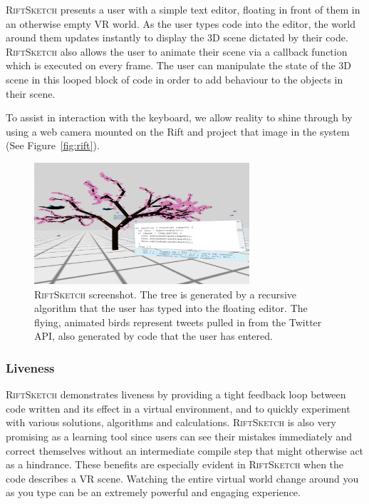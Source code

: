 \documentclass[conference]{IEEEtran}
\begin{document}
\textsc{RiftSketch} presents a user with a simple text editor, floating in front of them in an otherwise empty VR world. 
As the user types code into the editor, the world around them updates instantly to display the 3D scene dictated by their code. 
\textsc{RiftSketch} also allows the user to animate their scene via a callback function which is executed on every frame. 
The user can manipulate the state of the 3D scene in this looped block of code in order to add behaviour to the objects in their scene.

To assist in interaction with the keyboard, we allow reality to shine through by using a web camera mounted on the Rift and project that image in the system (See Figure~\ref{fig:rift}).

\begin{figure}[ht!]
\centering
\includegraphics[width=80mm]{figures/riftsketch/unwarped_tree}
\caption{\textsc{RiftSketch} screenshot. The tree is generated by a recursive algorithm that the user has typed into the floating editor. The flying, animated birds represent tweets pulled in from the Twitter API, also generated by code that the user has entered. \label{RiftSketch}}
\end{figure}

\subsubsection{Liveness}

\textsc{RiftSketch} demonstrates liveness by providing a tight feedback loop between code written and its effect in a virtual environment, and to quickly experiment with various solutions, algorithms and calculations. 
\textsc{RiftSketch} is also very promising as a learning tool since users can see their mistakes immediately and correct themselves without an intermediate compile step that might otherwise act as a hindrance.  
These benefits are especially evident in \textsc{RiftSketch} when the code describes a VR scene. 
Watching the entire virtual world change around you as you type can be an extremely powerful and engaging experience.
\end{document}
